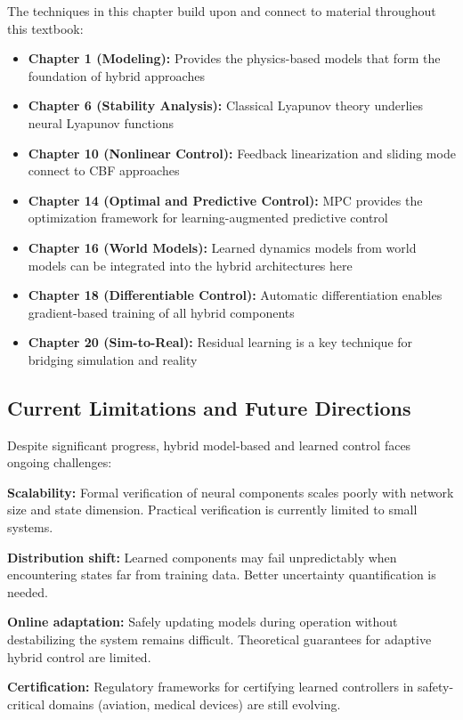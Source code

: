 The techniques in this chapter build upon and connect to material throughout this textbook:

\begin{itemize}
    \item \textbf{Chapter 1 (Modeling):} Provides the physics-based models that form the foundation of hybrid approaches
    \item \textbf{Chapter 6 (Stability Analysis):} Classical Lyapunov theory underlies neural Lyapunov functions
    \item \textbf{Chapter 10 (Nonlinear Control):} Feedback linearization and sliding mode connect to CBF approaches
    \item \textbf{Chapter 14 (Optimal and Predictive Control):} MPC provides the optimization framework for learning-augmented predictive control
    \item \textbf{Chapter 16 (World Models):} Learned dynamics models from world models can be integrated into the hybrid architectures here
    \item \textbf{Chapter 18 (Differentiable Control):} Automatic differentiation enables gradient-based training of all hybrid components
    \item \textbf{Chapter 20 (Sim-to-Real):} Residual learning is a key technique for bridging simulation and reality
\end{itemize}

\subsection{Current Limitations and Future Directions}

Despite significant progress, hybrid model-based and learned control faces ongoing challenges:

\textbf{Scalability:} Formal verification of neural components scales poorly with network size and state dimension. Practical verification is currently limited to small systems.

\textbf{Distribution shift:} Learned components may fail unpredictably when encountering states far from training data. Better uncertainty quantification is needed.

\textbf{Online adaptation:} Safely updating models during operation without destabilizing the system remains difficult. Theoretical guarantees for adaptive hybrid control are limited.

\textbf{Certification:} Regulatory frameworks for certifying learned controllers in safety-critical domains (aviation, medical devices) are still evolving.

